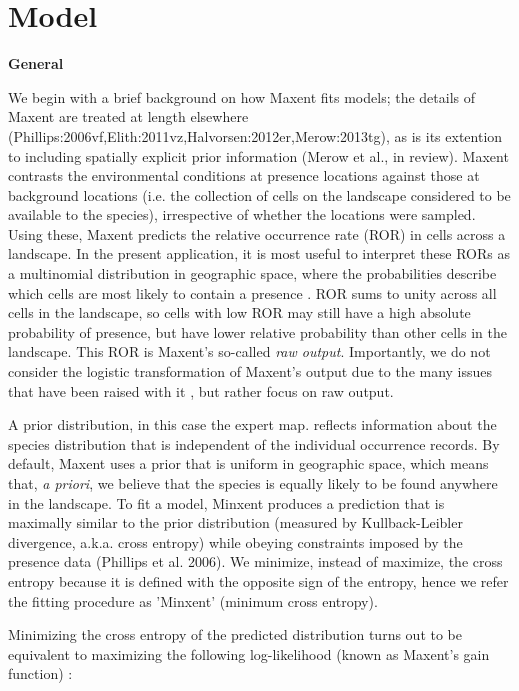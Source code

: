 \section{Model}
\label{sec:Model} 

\textbf{General} 

We begin with a brief background on how Maxent fits models; the details of Maxent are treated at length elsewhere (Phillips:2006vf,Elith:2011vz,Halvorsen:2012er,Merow:2013tg), as is its extention to including spatially explicit prior information (Merow et al., in review). 
Maxent contrasts the environmental conditions at presence locations against those at background locations (i.e. the collection of cells on the landscape considered to be available to the species), irrespective of whether the locations were sampled. Using these, Maxent predicts the relative occurrence rate (ROR) in cells across a landscape. In the present application, it is most useful to interpret these RORs as a multinomial distribution in geographic space, where the probabilities describe which cells are most likely to contain a presence \citep{Merow:2013tg}. ROR sums to unity across all cells in the landscape, so cells with low ROR may still have a high absolute probability of presence, but have lower relative probability than other cells in the landscape. This ROR is Maxent's so-called \emph{raw output}. Importantly, we do not consider the logistic transformation of Maxent's output \citep[cf. ][]{Phillips:2008uk} due to the many issues that have been raised with it \citep{Royle:2012vt,Merow:2013tg}, but rather focus on raw output.


A prior distribution, in this case the expert map. reflects information about the species distribution that is independent of the individual occurrence records. By default, Maxent uses a prior that is uniform in geographic space, which means that,  \emph{a priori}, we believe that the species is equally likely to be found anywhere in the landscape. To fit a model, Minxent produces a prediction that is maximally similar to the prior distribution (measured by Kullback-Leibler divergence, a.k.a. cross entropy) while obeying constraints imposed by the presence data (Phillips et al. 2006). We minimize, instead of maximize, the cross entropy because it is defined with the opposite sign of the entropy, hence we refer the fitting procedure as 'Minxent' (minimum cross entropy).


Minimizing the cross entropy of the predicted distribution turns out to be equivalent to maximizing the following log-likelihood (known as Maxent's gain function) \citep{Dudik:2004tc, Phillips:2006vf, Merow:2013tg}:


